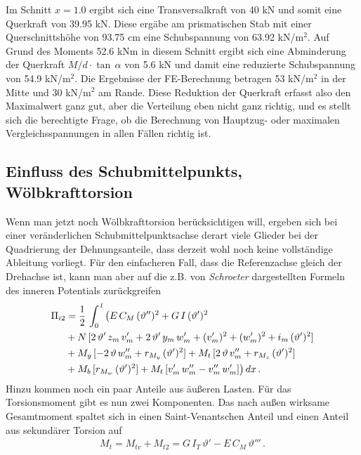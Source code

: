 Im Schnitt $x=1.0$ ergibt sich eine Transversalkraft von 40 kN und somit eine Querkraft von 39.95 kN. Diese erg\"{a}be am prismatischen Stab mit einer Querschnittsh\"{o}he von 93.75 cm eine Schubspannung von 63.92 kN/m$^2$. Auf Grund des Moments 52.6 kNm in diesem Schnitt ergibt sich eine Abminderung der Querkraft $M/d \cdot\tan\,\alpha$ von 5.6 kN und damit eine reduzierte Schubspannung von 54.9 kN/m$^2$. Die Ergebnisse der FE-Berechnung betragen 53 kN/m$^2$ in der Mitte und 30 kN/m$^2$ am Rande. Diese Reduktion der Querkraft erfasst also den Maximalwert ganz gut, aber die Verteilung eben nicht ganz richtig, und es stellt sich die berechtigte Frage, ob die Berechnung von Hauptzug- oder maximalen Vergleichsspannungen in allen F\"{a}llen richtig ist. 
{\textcolor{sectionTitleBlue}{\subsection{Einfluss des Schubmittelpunkts, W\"{o}lbkrafttorsion}}}
Wenn man jetzt noch W\"{o}lbkrafttorsion ber\"{u}cksichtigen will, ergeben sich bei einer ver\"{a}nderlichen Schubmittelpunktsachse derart viele Glieder bei der Quadrierung der Dehnungsanteile, dass derzeit wohl noch keine vollst\"{a}ndige Ableitung vorliegt. F\"{u}r den einfacheren Fall, dass die Referenzachse gleich der Drehachse ist, kann man aber auf die z.B. von {\em Schroeter\/} \cite{Schroeter2} dargestellten Formeln des inneren Potentials zur\"{u}ckgreifen 
\begin{align}
\Pi_{i2} &= \frac{1}{2}\,\int_0^{\,l} \big(E\,C_M \,(\vartheta'')^2 + G\,I\,(\vartheta')^2 \nonumber\\
&+ N\,[ 2\,\vartheta'\,z_m\,v_m' + 2\,\vartheta'\,y_m\,w_m' + (v_m')^2 + (w_m')^2 +
i_m\,(\vartheta')^2] \nonumber\\
&+ M_y\,[- 2\,\vartheta\,w_m'' + r_{M_y}\,(\vartheta')^2] + M_t\,[2\,\vartheta\,v_m''
+ r_{M_z}\,(\vartheta')^2] \nonumber\\
&+ M_b\,[r_{M_w}\,(\vartheta')^2] + M_t\,[v_m'\,w_m'' - v_m''\,w_m']
 \big)\,dx\,.
\end{align}
Hinzu kommen noch ein paar Anteile aus \"{a}u{\ss}eren Lasten. F\"{u}r das Torsionsmoment gibt es nun zwei Komponenten. Das nach au{\ss}en wirksame Gesamtmoment spaltet sich in einen Saint-Venantschen Anteil und einen Anteil aus sekund\"{a}rer Torsion auf
\begin{align}
M_t = M_{tv} + M_{t2} = G\,I_T\,\vartheta' - E\,C_M\,\vartheta'''\,.
\end{align}
